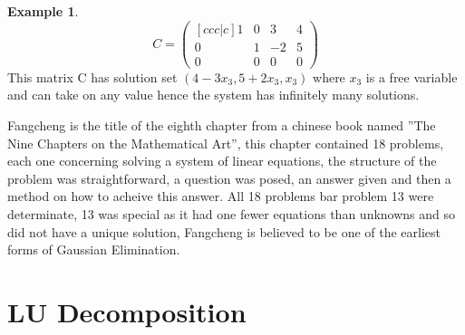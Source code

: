\documentclass[12pt,reqno,twoside,titlepage]{article}
\theoremstyle{definition}
\newtheorem{exmp}{Example}[section]
\begin{document}
\begin{exmp}
\begin{equation*}
    C =
    \begin{pmatrix}[ccc|c]
    1 & 0 & 3 & 4 \\
    0 & 1 & -2 & 5 \\
    0 & 0 & 0 & 0
    \end{pmatrix}
\end{equation*}
This matrix C has solution set $(4-3x_{3}, 5+2x_{3}, x_{3})$ where $x_{3}$ is a free variable and can take on any value hence the system has infinitely many solutions.
\end{exmp}

Fangcheng is the title of the eighth chapter from a chinese book named ”The Nine Chapters on the Mathematical Art”, this chapter contained 18 problems, each one concerning solving a system of linear equations, the structure of the problem was straightforward, a question was posed, an answer given and then a method on how to acheive this answer. All 18 problems bar problem 13 were determinate, 13 was special as it had one fewer equations than unknowns and so did not have a unique solution, Fangcheng is believed to be one of the earliest forms of Gaussian Elimination.


\newpage
\section{LU Decomposition}
\label{sec:LUD}
\end{document}
